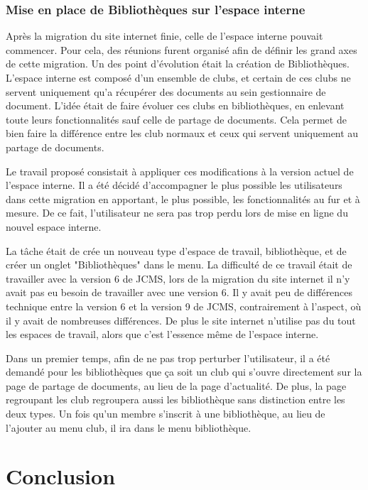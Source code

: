 \documentclass[12pt,a4paper]{article}
\begin{document}
\subsubsection{Mise en place de Bibliothèques sur l'espace interne}
Après la migration du site internet finie, celle de l'espace interne pouvait commencer. Pour cela, des réunions furent organisé afin de définir les grand axes de cette migration. Un des point d'évolution était la création de Bibliothèques. L'espace interne est composé d'un ensemble de clubs, et certain de ces clubs ne servent uniquement qu'a récupérer des documents au sein gestionnaire de document. L'idée était de faire évoluer ces clubs en bibliothèques, en enlevant toute leurs fonctionnalités sauf celle de partage de documents. Cela permet de bien faire la différence entre les club normaux et ceux qui servent uniquement au partage de documents.\par 
Le travail proposé consistait à appliquer ces modifications à la version actuel de l'espace interne. Il a été décidé d'accompagner le plus possible les utilisateurs dans cette migration en apportant, le plus possible, les fonctionnalités au fur et à mesure. De ce fait, l'utilisateur ne sera pas trop perdu lors de mise en ligne du nouvel espace interne.\par 
La tâche était de crée un nouveau type d'espace de travail, bibliothèque, et de créer un onglet "Bibliothèques" dans le menu. La difficulté de ce travail était de travailler avec la version 6 de JCMS, lors de la migration du site internet il n'y avait pas eu besoin de travailler avec une version 6. Il y avait peu de différences technique entre la version 6 et la version 9 de JCMS, contrairement à l'aspect, où il y avait de nombreuses différences. De plus le site internet n'utilise pas du tout les espaces de travail, alors que c'est l'essence même de l'espace interne.\par 
Dans un premier temps, afin de ne pas trop perturber l'utilisateur, il a été demandé pour les bibliothèques que ça soit un club qui s'ouvre directement sur la page de partage de documents, au lieu de la page d'actualité. De plus, la page regroupant les club regroupera aussi les bibliothèque sans distinction entre les deux types. Un fois qu'un membre s'inscrit à une bibliothèque, au lieu de l'ajouter au menu club, il ira dans le menu bibliothèque.\par

\newpage
\section{Conclusion}

\listoffigures
\end{document}
